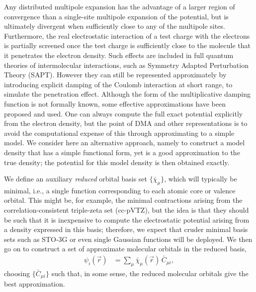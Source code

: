 \documentclass[journal=jacsat,manuscript=article]{achemso}
\begin{document}
Any distributed multipole expansion has the advantage of a larger region of convergence than a single-site multipole expansion of the potential, but is ultimately divergent when sufficiently close to any of the multipole sites.  Furthermore, the real electrostatic interaction of a test charge with the electrons is partially screened once the test charge is sufficiently close to the molecule that it penetrates the electron density\cite{Kreek1969}.
Such effects are included in full quantum theories of intermolecular interactions, such as Symmetry Adapted Perturbation Theory (SAPT)\cite{Jeziorski1994}.
However they can still be represented approximately by introducing explicit damping of the Coulomb interaction at short range, to simulate the penetration effect.
Although the form of the multiplicative damping function is not formally known, some effective approximations
have been proposed and used\cite{Kreek1969,Koide1981a,Tang1984AnCoefficients,Knowles1986,Knowles1986a,Knowles1987a}.
One can always compute the full exact potential explicitly from the electron density, but the point of DMA and other representations is to avoid the computational expense of this through approximating to a simple model.
We consider here an alternative approach, namely to construct a model density that has a simple functional form, yet is a good approximation to the true density; the potential for this model density is then obtained exactly.

We define an auxiliary \emph{reduced} orbital basis set $\{\bar\chi_\mu\}$, which will typically be minimal, i.e., a single function corresponding to each atomic core or valence orbital.
This might be, for example, the minimal contractions arising from the correlation-consistent triple-zeta set (cc-pVTZ)\cite{DunningJr1989a}, but the  idea is
that they should be such that it is inexpensive to compute the electrostatic potential arising from a density expressed in this basis; therefore, we expect that cruder minimal basis sets such as STO-3G\cite{Hehre1969} or even single Gaussian functions will be deployed.
We then go on to construct a set of approximate molecular orbitals in the reduced basis,
\begin{align}
    \psi_i(\vec r) &= \sum_\mu \bar\chi_\mu(\vec r)\,\bar C_{\mu i}
    ,
\end{align}
choosing
$\{\bar C_{\mu i}\}$ such that, in some sense, the reduced molecular orbitals give the best approximation.
\end{document}
